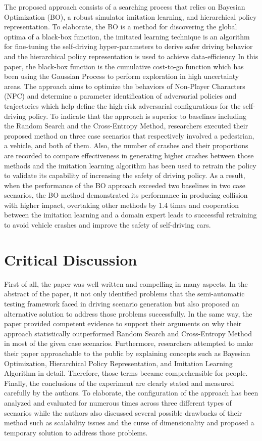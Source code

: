 \documentclass[10pt,a4paper]{report}
\begin{document}
The proposed approach consists of a searching process that relies on Bayesian Optimization (BO), a robust simulator imitation learning, and hierarchical policy representation.
%
To elaborate, the BO is a method for discovering the global optima of a black-box function, the imitated learning technique is an algorithm for fine-tuning the self-driving hyper-parameters to derive safer driving behavior and the hierarchical policy representation is used to achieve data-efficiency
%
In this paper, the black-box function is the cumulative cost-to-go function which has been using the Gaussian Process to perform exploration in high uncertainty areas.
%
The approach aims to optimize the behaviors of Non-Player Characters (NPC)
%
and determine a parameter identification of adversarial policies and trajectories which help define the high-risk adversarial configurations for the self-driving policy. 
% 
To indicate that the approach is superior to baselines including the Random Search and the Cross-Entropy Method, researchers executed their proposed method on three case scenarios that respectively involved a pedestrian, a vehicle, and both of them.
%
Also, the number of crashes and their proportions are recorded to compare effectiveness in generating higher crashes between those methods and
%
the imitation learning algorithm has been used to retrain the policy to validate its capability of increasing the safety of driving policy.
%
As a result, when the performance of the BO approach exceeded two baselines in two case scenarios, the BO method demonstrated its performance in producing collision with higher impact, overtaking other methods by 1.4 times and cooperation between the imitation learning and a domain expert leads to successful retraining to avoid vehicle crashes and improve the safety of self-driving cars.

\section{Critical Discussion}
First of all, the paper was well written and compelling in many aspects. In the abstract of the paper, it not only identified problems that the semi-automatic testing framework faced in driving scenario generation but also proposed an alternative solution to address those problems successfully. 
%
In the same way, the paper provided competent evidence to support their arguments on why their approach statistically outperformed Random Search and Cross-Entropy Method in most of the given case scenarios.
%
Furthermore, researchers attempted to make their paper approachable to the public by explaining concepts such as Bayesian Optimization, Hierarchical Policy Representation, and Imitation Learning Algorithm in detail.
%
Therefore, those terms became comprehensible for people.  
%
Finally, the conclusions of the experiment are clearly stated and measured carefully by the authors. 
%
To elaborate, the configuration of the approach has been analyzed and evaluated for numerous times across three different types of scenarios while the authors also discussed several possible drawbacks of their method such as scalability issues and the curse of dimensionality and proposed a temporary solution to address those problems.
%
\end{document}
